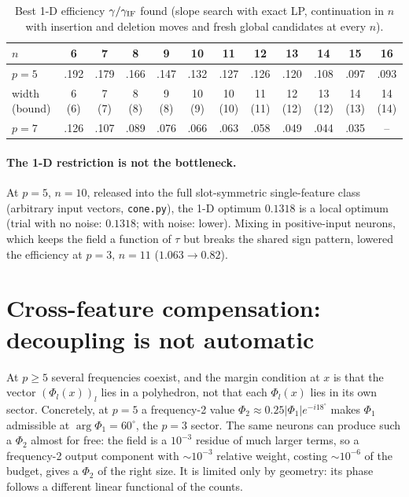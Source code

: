 \documentclass[11pt]{article}
\theoremstyle{definition}
\begin{document}
\begin{table}[h]
\centering\footnotesize\setlength{\tabcolsep}{2.5pt}
\begin{tabular}{lccccccccccc}
\toprule
$n$ & 6 & 7 & 8 & 9 & 10 & 11 & 12 & 13 & 14 & 15 & 16\\
\midrule
$p=5$ & .192 & .179 & .166 & .147 & .132 & .127 & .126 & .120 & .108 & .097 & .093\\
width (bound) & 6 (6) & 7 (7) & 8 (8) & 9 (8) & 10 (9) & 10 (10) & 11 (11) & 12 (12) & 13 (12) & 14 (13) & 14 (14)\\
\midrule
$p=7$ & .126 & .107 & .089 & .076 & .066 & .063 & .058 & .049 & .044 & .035 & --\\
\bottomrule
\end{tabular}
\caption{Best 1-D efficiency $\gamma/\gamma_{\rm IF}$ found (slope search with exact LP, continuation in $n$ with insertion
and deletion moves and fresh global candidates at every $n$).}
\label{tab:p5}
\end{table}

\paragraph{The 1-D restriction is not the bottleneck.}  At $p=5$, $n=10$, released into the full slot-symmetric
single-feature class (arbitrary input vectors, \texttt{cone.py}), the 1-D optimum $0.1318$ is a local optimum (trial with
no noise: $0.1318$; with noise: lower).  Mixing in positive-input neurons, which keeps the field a function of $\tau$
but breaks the shared sign pattern, lowered the efficiency at $p=3$, $n=11$ ($1.063\to0.82$).

\section{Cross-feature compensation: decoupling is not automatic}
At $p\ge5$ several frequencies coexist, and the margin condition at $x$ is that the vector $(\Phi_l(x))_l$ lies in a
polyhedron, not that each $\Phi_l(x)$ lies in its own sector.  Concretely, at $p=5$ a frequency-2 value
$\Phi_2\approx0.25|\Phi_1|e^{-i18^\circ}$ makes $\Phi_1$ admissible at $\arg\Phi_1=60^\circ$, the $p=3$ sector.
The same neurons can produce such a $\Phi_2$ almost for free: the field is a $10^{-3}$ residue of much larger terms, so a
frequency-2 output component with $\sim10^{-3}$ relative weight, costing $\sim10^{-6}$ of the budget, gives a $\Phi_2$ of the
right size.  It is limited only by geometry: its phase follows a different linear functional of the counts.
\end{document}
